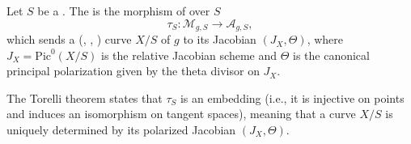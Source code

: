 \begin{definition} \label{definition:torelli_morphism_over_a_scheme}
    Let $S$ be a . The  is the morphism of  over $S$
    $$\tau_S\colon \mathcal{M}_{g, S} \to \mathcal{A}_{g, S},$$
    which sends a (, , ) curve $X/S$ of  $g$ to its Jacobian $(J_X, \Theta)$, where $J_X = \mathrm{Pic}^0(X/S)$ is the relative Jacobian scheme and $\Theta$ is the canonical principal polarization given by the theta divisor on $J_X$.

    The Torelli theorem states that $\tau_S$ is an embedding (i.e., it is injective on points and induces an isomorphism on tangent spaces), meaning that a curve $X/S$ is uniquely determined by its polarized Jacobian $(J_X, \Theta)$.
\end{definition}
